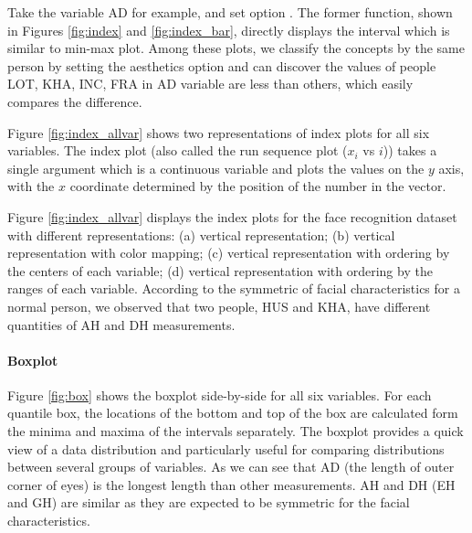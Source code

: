 \documentclass[article]{jss}
\begin{document}
Take the variable AD for example, and set option . The former function, shown in Figures \ref{fig:index} and \ref{fig:index_bar}, directly displays the interval which is similar to min-max plot. Among these plots, we classify the concepts by the same person by setting the aesthetics option  and can discover the values of people LOT, KHA, INC, FRA in AD variable are less than others, which easily compares the difference. 


Figure \ref{fig:index_allvar} shows two representations 
of index plots for all six variables. The index plot (also
called the run sequence plot ($x_i$ vs $i$)) takes a single
argument which is a continuous variable and plots the
values on the $y$ axis, with the $x$ coordinate determined
by the position of the number in the vector. 



Figure \ref{fig:index_allvar} displays the index plots for the face recognition 
dataset with different representations: (a) vertical representation; (b) 
vertical representation with color mapping; (c) vertical representation with 
ordering by the centers of each variable; (d) vertical representation with 
ordering by the ranges of each variable. According to the symmetric of facial
characteristics for a normal person, we observed that two
people, HUS and KHA, have different quantities of AH and DH
measurements.

\paragraph{Boxplot} Figure \ref{fig:box} shows
the boxplot side-by-side for all six variables. For each
quantile box, the locations of the bottom and top of the
box are calculated form the minima and maxima of
the intervals separately. The boxplot provides a quick view of
a data distribution and particularly useful for comparing
distributions between several groups of variables. As we
can see that AD (the length of outer corner of eyes) is the
longest length than other measurements. AH and DH (EH and
GH) are similar as they are expected to be symmetric for the facial
characteristics.
\end{document}
